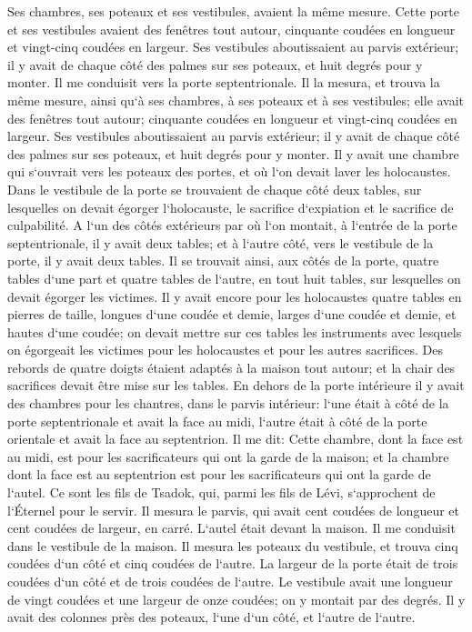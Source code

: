 \verse Ses chambres, ses poteaux et ses vestibules, avaient la même mesure. Cette porte et ses vestibules avaient des fenêtres tout autour, cinquante coudées en longueur et vingt-cinq coudées en largeur. 
\verse Ses vestibules aboutissaient au parvis extérieur; il y avait de chaque côté des palmes sur ses poteaux, et huit degrés pour y monter. 
\verse Il me conduisit vers la porte septentrionale. Il la mesura, et trouva la même mesure, 
\verse ainsi qu`à ses chambres, à ses poteaux et à ses vestibules; elle avait des fenêtres tout autour; cinquante coudées en longueur et vingt-cinq coudées en largeur. 
\verse Ses vestibules aboutissaient au parvis extérieur; il y avait de chaque côté des palmes sur ses poteaux, et huit degrés pour y monter. 
\verse Il y avait une chambre qui s`ouvrait vers les poteaux des portes, et où l`on devait laver les holocaustes. 
\verse Dans le vestibule de la porte se trouvaient de chaque côté deux tables, sur lesquelles on devait égorger l`holocauste, le sacrifice d`expiation et le sacrifice de culpabilité. 
\verse A l`un des côtés extérieurs par où l`on montait, à l`entrée de la porte septentrionale, il y avait deux tables; et à l`autre côté, vers le vestibule de la porte, il y avait deux tables. 
\verse Il se trouvait ainsi, aux côtés de la porte, quatre tables d`une part et quatre tables de l`autre, en tout huit tables, sur lesquelles on devait égorger les victimes. 
\verse Il y avait encore pour les holocaustes quatre tables en pierres de taille, longues d`une coudée et demie, larges d`une coudée et demie, et hautes d`une coudée; on devait mettre sur ces tables les instruments avec lesquels on égorgeait les victimes pour les holocaustes et pour les autres sacrifices. 
\verse Des rebords de quatre doigts étaient adaptés à la maison tout autour; et la chair des sacrifices devait être mise sur les tables. 
\verse En dehors de la porte intérieure il y avait des chambres pour les chantres, dans le parvis intérieur: l`une était à côté de la porte septentrionale et avait la face au midi, l`autre était à côté de la porte orientale et avait la face au septentrion. 
\verse Il me dit: Cette chambre, dont la face est au midi, est pour les sacrificateurs qui ont la garde de la maison; 
\verse et la chambre dont la face est au septentrion est pour les sacrificateurs qui ont la garde de l`autel. Ce sont les fils de Tsadok, qui, parmi les fils de Lévi, s`approchent de l`Éternel pour le servir. 
\verse Il mesura le parvis, qui avait cent coudées de longueur et cent coudées de largeur, en carré. L`autel était devant la maison. 
\verse Il me conduisit dans le vestibule de la maison. Il mesura les poteaux du vestibule, et trouva cinq coudées d`un côté et cinq coudées de l`autre. La largeur de la porte était de trois coudées d`un côté et de trois coudées de l`autre. 
\verse Le vestibule avait une longueur de vingt coudées et une largeur de onze coudées; on y montait par des degrés. Il y avait des colonnes près des poteaux, l`une d`un côté, et l`autre de l`autre. 

